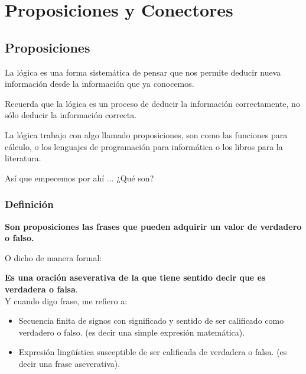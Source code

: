 \documentclass[12pt]{report}                                    %
\begin{document}
\chapter{Proposiciones y Conectores}
    \clearpage

    \section{Proposiciones}

        La lógica es una forma sistemática de pensar que nos permite deducir nueva información desde la
        información que ya conocemos.

        Recuerda que la lógica es un proceso de deducir la información correctamente,
        no sólo deducir la información correcta.

        La lógica trabajo con algo llamado proposiciones, son como las funciones para
        cálculo, o los lenguajes de programación para informática o los libros para la literatura.

        Así que empecemos por ahí ... ¿Qué son?


        \subsection*{Definición}
            
            \textbf{Son proposiciones las frases que pueden adquirir un valor de verdadero o falso.}
            
            O dicho de manera formal:

            \textbf{Es una oración aseverativa de la que tiene sentido decir que es verdadera o falsa}.\\

            Y cuando digo frase, me refiero a:
            \begin{itemize}
                \item Secuencia finita de signos con significado y sentido de ser calificado como verdadero o falso.
                        (es decir una simple expresión matemática).

                \item Expresión lingüística susceptible de ser calificada de verdadera o falsa.
                        (es decir una frase aseverativa).
            \end{itemize}
\end{document}
